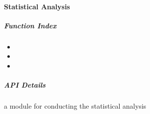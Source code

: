 \documentclass[letterpaper,10pt,english]{sphinxhowto}
\begin{document}
\sphinxstepscope

\clearpage


\paragraph{Statistical Analysis}
\label{\detokenize{stats_cal:statistical-analysis}}\label{\detokenize{stats_cal::doc}}
\sphinxAtStartPar
{}


\subparagraph{Function Index}
\label{\detokenize{stats_cal:function-index}}\begin{itemize}
\item {} 
\sphinxAtStartPar
{}

\item {} 
\sphinxAtStartPar
{}

\item {} 
\sphinxAtStartPar
{}

\end{itemize}


\subparagraph{API Details}
\label{\detokenize{stats_cal:module-neurora.stats_cal}}\label{\detokenize{stats_cal:api-details}}
\sphinxAtStartPar
a module for conducting the statistical analysis
\end{document}
